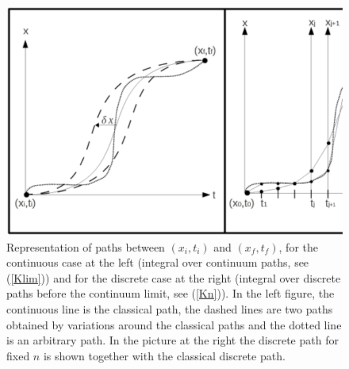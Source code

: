 \documentclass[12pt]{article}   %
\begin{document}
\begin{figure}
 \centering
\includegraphics[width=130mm]{Fig0.ps}
\caption{\label{Fig.0} Representation of paths between $(x_i,t_i)$ and $(x_f,t_f)$, 
for the continuous case at the left (integral over continuum paths, see (\ref{Klim})) 
and for the discrete case at the right (integral over discrete paths before the continuum limit, see (\ref{Kn})).
In the left figure, the continuous line is the classical path, 
the dashed lines are two paths obtained by variations around the classical paths
and the dotted line is an arbitrary path.
In the picture at the right the discrete path for fixed $n$ is shown together 
with the classical discrete path.} 
\end{figure}
\end{document}
